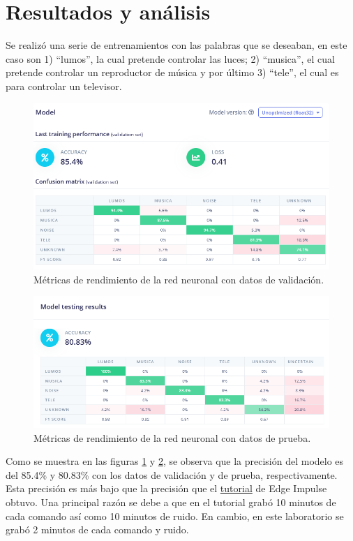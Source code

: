 \section{Resultados y análisis}

Se realizó una serie de entrenamientos con las palabras que se deseaban, en este caso son 1) ``lumos'', la cual pretende controlar las luces; 2) ``musica'', el cual pretende controlar un reproductor de música y por último 3) ``tele'', el cual es para controlar un televisor.

\begin{figure}[H]
    \centering
    \includegraphics[width=\textwidth]{Imagenes/training.png}
    \caption{Métricas de rendimiento de la red neuronal con datos de validación.}
    \label{valid-data}
\end{figure}

\begin{figure}[H]
    \centering
    \includegraphics[width=\textwidth]{Imagenes/testing.png}
    \caption{Métricas de rendimiento de la red neuronal con datos de prueba.}
    \label{test-data}
\end{figure}

Como se muestra en las figuras \ref{valid-data} y \ref{test-data}, 
se observa que la precisión del modelo es del 85.4\% y 80.83\% con los datos de validación y de prueba, respectivamente. Esta precisión es más bajo que la precisión que el \href{https://docs.edgeimpulse.com/docs/tutorials/end-to-end-tutorials/responding-to-your-voice}{tutorial} de Edge Impulse obtuvo. Una principal razón se debe a que en el tutorial grabó 10 minutos de cada comando así como 10 minutos de ruido. En cambio, en este laboratorio se grabó 2 minutos de cada comando y ruido.


